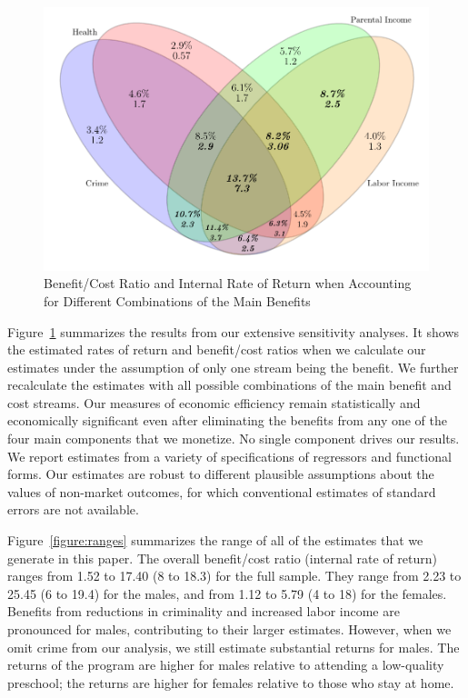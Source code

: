 \begin{figure}[!htbp]
\caption{Benefit/Cost Ratio and Internal Rate of Return when Accounting for Different Combinations of the Main Benefits}\label{figure:vennpooled}
\centering
\includegraphics[width=.7\columnwidth]{output/venn_pooled.pdf}
\end{figure}

Figure~\ref{figure:vennpooled} summarizes the results from our extensive sensitivity analyses. It shows the estimated rates of return and benefit/cost ratios when we calculate our estimates under the assumption of only one stream being the benefit. We further recalculate the estimates with all possible combinations of the main benefit and cost streams. Our measures of economic efficiency remain statistically and economically significant even after eliminating the benefits from any one of the four main components that we monetize. No single component drives our results. We report estimates from a variety of specifications of regressors and functional forms. Our estimates are robust to different plausible assumptions about the values of non-market outcomes, for which conventional estimates of standard errors are not available.

Figure~\ref{figure:ranges} summarizes the range of all of the estimates that we generate in this paper. The overall benefit/cost ratio (internal rate of return) ranges from 1.52 to 17.40 (8 to 18.3) for the full sample. They range from 2.23 to 25.45 (6 to 19.4) for the males, and from 1.12 to 5.79 (4 to 18) for the females. Benefits from reductions in criminality and increased labor income are pronounced for males, contributing to their larger estimates. However, when we omit crime from our analysis, we still estimate substantial returns for males. The returns of the program are higher for males relative to attending a low-quality preschool; the returns are higher for females relative to those who stay at home.

